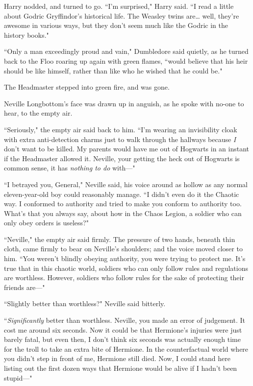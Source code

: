 Harry nodded, and turned to go. ``I'm surprised," Harry said. ``I read a little about Godric Gryffindor's historical life. The Weasley twins are{\ldots} well, they're awesome in various ways, but they don't seem much like the Godric in the history books."

``Only a man exceedingly proud and vain," Dumbledore said quietly, as he turned back to the Floo roaring up again with green flames, ``would believe that his heir should be like himself, rather than like who he wished that he could be."

The Headmaster stepped into green fire, and was gone.


Neville Longbottom's face was drawn up in anguish, as he spoke with no-one to hear, to the empty air.

``Seriously," the empty air said back to him. ``I'm wearing an invisibility cloak with extra anti-detection charms just to walk through the hallways because \emph{I} don't want to be killed. My parents would have me out of Hogwarts in an instant if the Headmaster allowed it. Neville, your getting the heck out of Hogwarts is common sense, it has \emph{nothing to do} with—"

``I betrayed you, General," Neville said, his voice around as hollow as any normal eleven-year-old boy could reasonably manage. ``I didn't even do it the Chaotic way. I conformed to authority and tried to make you conform to authority too. What's that you always say, about how in the Chaos Legion, a soldier who can only obey orders is useless?"

``Neville," the empty air said firmly. The pressure of two hands, beneath thin cloth, came firmly to bear on Neville's shoulders; and the voice moved closer to him. ``You weren't blindly obeying authority, you were trying to protect me. It's true that in this chaotic world, soldiers who can only follow rules and regulations are worthless. However, soldiers who follow rules for the sake of protecting their friends are—"

``Slightly better than worthless?" Neville said bitterly.

``\emph{Significantly} better than worthless. Neville, you made an error of judgement. It cost me around six seconds. Now it could be that Hermione's injuries were just barely fatal, but even then, I don't think six seconds was actually enough time for the troll to take an extra bite of Hermione. In the counterfactual world where you didn't step in front of me, Hermione still died. Now, I could stand here listing out the first dozen ways that Hermione would be alive if I hadn't been stupid—"

